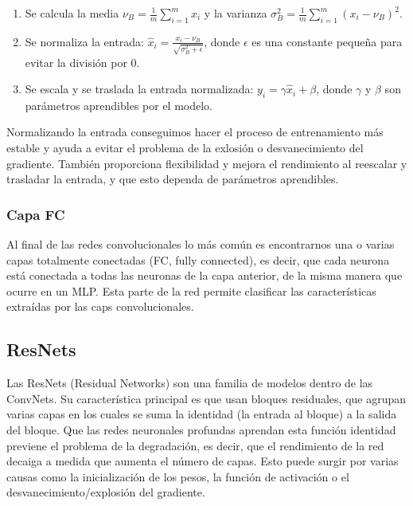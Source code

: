 \begin{enumerate}

	\item Se calcula la media $\nu_{B}= \frac{1}{m} \sum_{i=1}^{m}x_i$ y la varianza $\sigma^{2}_B=\frac{1}{m} \sum_{i=1}^m(x_i - \nu_B)^2$.
	
	\item Se normaliza la entrada: $\hat{x}_i = \frac{x_i - \nu_B}{\sqrt{\sigma^{2}_B + \epsilon}}$, donde $\epsilon$ es una constante pequeña para evitar la división por 0.
	
	\item Se escala y se traslada la entrada normalizada: $y_i=\gamma \hat{x}_i + \beta$, donde $\gamma$ y $\beta$ son parámetros aprendibles por el modelo.
\end{enumerate}

Normalizando la entrada conseguimos hacer el proceso de entrenamiento más estable y ayuda a evitar el problema de la exlosión o desvanecimiento del gradiente. También proporciona flexibilidad y mejora el rendimiento al reescalar y trasladar la entrada, y que esto dependa de parámetros aprendibles.

\subsubsection{Capa FC}

Al final de las redes convolucionales lo más común es encontrarnos una o varias capas totalmente conectadas (FC, fully connected), es decir, que cada neurona está conectada a todas las neuronas de la capa anterior, de la misma manera que ocurre en un MLP. Esta parte de la red permite clasificar las características extraídas por las caps convolucionales.


\subsection{ResNets}
\label{sec:resnets}

Las ResNets (Residual Networks) \cite{ResNets} son una familia de modelos dentro de las ConvNets. Su característica principal es que usan bloques residuales, que agrupan varias capas en los cuales se suma la identidad (la entrada al bloque) a la salida del bloque. Que las redes neuronales profundas aprendan esta función identidad previene el problema de la degradación, es decir, que el rendimiento de la red decaiga a medida que aumenta el número de capas. Esto puede surgir por varias causas como la inicialización de los pesos, la función de activación o el desvanecimiento/explosión del gradiente. 

